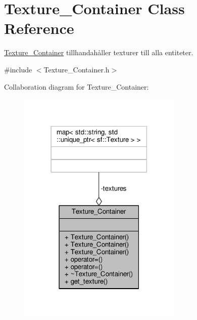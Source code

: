 \hypertarget{classTexture__Container}{\section{Texture\+\_\+\+Container Class Reference}
\label{classTexture__Container}
}


\hyperlink{classTexture__Container}{Texture\+\_\+\+Container} tillhandahåller texturer till alla entiteter.  




{\ttfamily \#include $<$Texture\+\_\+\+Container.\+h$>$}



Collaboration diagram for Texture\+\_\+\+Container\+:\nopagebreak
\begin{figure}[H]
\begin{center}
\leavevmode
\includegraphics[width=222pt]{classTexture__Container__coll__graph}
\end{center}
\end{figure}

